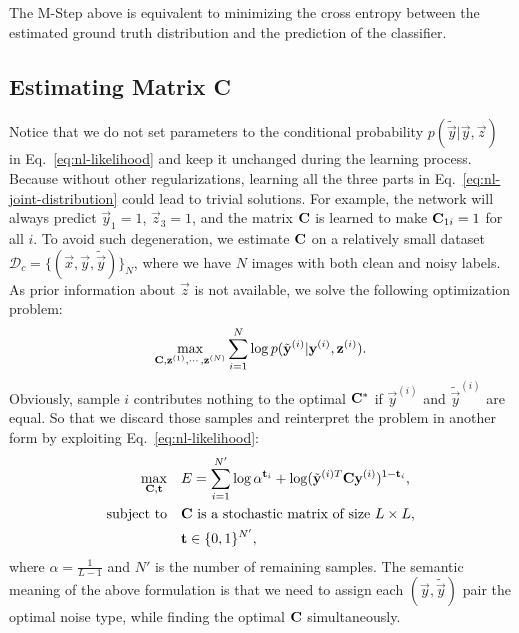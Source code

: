 The M-Step above is equivalent to minimizing the cross entropy between the estimated ground truth distribution and the prediction of the classifier.

\subsection{Estimating Matrix C} %
\label{sub:nl-confusion-estimation}
Notice that we do not set parameters to the conditional probability $p(\tilde{\vec{y}}|\vec{y},\vec{z})$ in Eq.~\eqref{eq:nl-likelihood} and keep it unchanged during the learning process. Because without other regularizations, learning all the three parts in Eq.~\eqref{eq:nl-joint-distribution} could lead to trivial solutions. For example, the network will always predict $\vec{y}_1 = 1$, $\vec{z}_3 = 1$, and the matrix $\mathbf{C}$ is learned to make $\mathbf{C}_{1i} = 1$ for all $i$. To avoid such degeneration, we estimate $\mathbf{C}$ on a relatively small dataset $\mathcal{D}_c = \{(\vec{x},\vec{y},\tilde{\vec{y}})\}_N$, where we have $N$ images with both clean and noisy labels. As prior information about $\vec{z}$ is not available, we solve the following optimization problem:
\begin{equation} \label{eq:nl-opt-all}
    \max_{\mathbf{C},\mathbf{z}^{(1)},\cdots,\mathbf{z}^{(N)}} \sum_{i=1}^N \log p(\tilde{\mathbf{y}}^{(i)}|\mathbf{y}^{(i)},\mathbf{z}^{(i)}).
\end{equation}
Obviously, sample $i$ contributes nothing to the optimal $\mathbf{C}^*$ if $\vec{y}^{(i)}$ and $\tilde{\vec{y}}^{(i)}$ are equal. So that we discard those samples and reinterpret the problem in another form by exploiting Eq.~\eqref{eq:nl-likelihood}:
\begin{equation}
\begin{aligned}
\max_{\mathbf{C},\mathbf{t}} \quad & E=\sum_{i=1}^{N'} \log \alpha^{\mathbf{t}_i} + \log (\tilde{\mathbf{y}}^{(i)T} \mathbf{C} \mathbf{y}^{(i)})^{1-\mathbf{t}_i},\\
\text{subject to} \quad & \mathbf{C} \text{ is a stochastic matrix of size } L\times L, \\
                    & \mathbf{t} \in \{0,1\}^{N'},
\end{aligned}
\end{equation}
where $\alpha=\frac{1}{L-1}$ and $N'$ is the number of remaining samples. The semantic meaning of the above formulation is that we need to assign each $(\vec{y},\tilde{\vec{y}})$ pair the optimal noise type, while finding the optimal $\mathbf{C}$ simultaneously.

